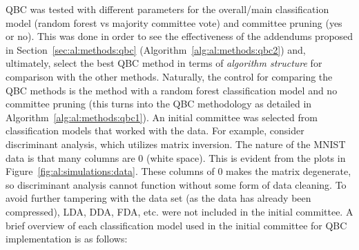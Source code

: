 \noindent QBC was tested with different parameters for the overall/main 
classification model (random forest vs majority committee vote) and committee 
pruning (yes or no). This was done in order to see the effectiveness of the 
addendums proposed in Section~\ref{sec:al:methods:qbc} 
(Algorithm~\ref{alg:al:methods:qbc2}) and, 
ultimately, select the best QBC method in terms of \textit{algorithm structure} 
for comparison with the other methods. Naturally, the control for comparing the 
QBC methods is the method with a random forest classification model and no 
committee pruning (this turns into the QBC methodology as detailed in 
Algorithm~\ref{alg:al:methods:qbc1}). An initial committee was selected from 
classification models that worked with the data. 
For example, consider discriminant analysis, which utilizes matrix inversion. 
The nature of the MNIST data is that many columns are 0 (white space). This is 
evident from the plots in Figure~\ref{fig:al:simulations:data}. These columns 
of 0 makes the matrix degenerate, so discriminant analysis cannot function 
without some form of data cleaning. 
To avoid further tampering with the data set (as the data has already been 
compressed), LDA, DDA, FDA, etc. were not included in the initial committee. 
A brief overview of each classification model used in the initial committee 
for QBC implementation is as follows:

